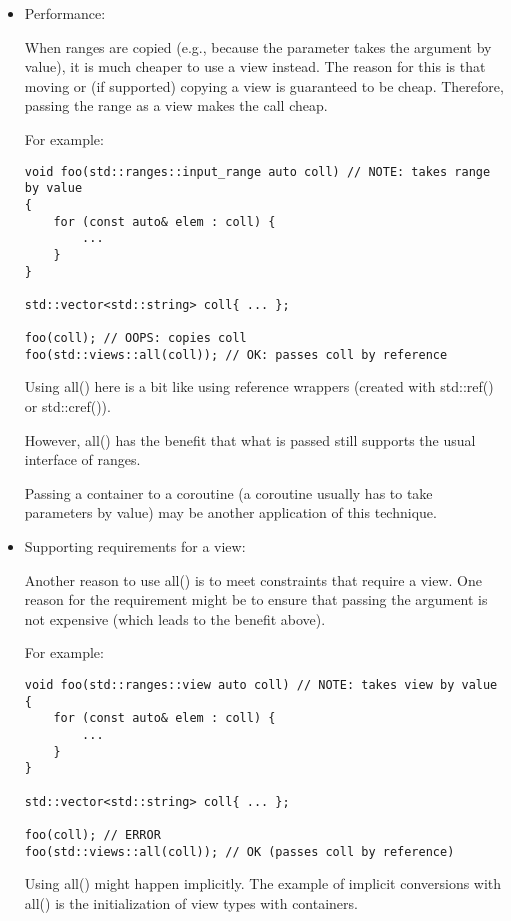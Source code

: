 \begin{itemize}
\item
Performance:

When ranges are copied (e.g., because the parameter takes the argument by value), it is much cheaper to use a view instead. The reason for this is that moving or (if supported) copying a view is guaranteed to be cheap. Therefore, passing the range as a view makes the call cheap.

For example:

\begin{lstlisting}[style=styleCXX]
void foo(std::ranges::input_range auto coll) // NOTE: takes range by value
{
	for (const auto& elem : coll) {
		...
	}
}

std::vector<std::string> coll{ ... };

foo(coll); // OOPS: copies coll
foo(std::views::all(coll)); // OK: passes coll by reference
\end{lstlisting}

Using all() here is a bit like using reference wrappers (created with std::ref() or std::cref()).

However, all() has the benefit that what is passed still supports the usual interface of ranges.

Passing a container to a coroutine (a coroutine usually has to take parameters by value) may be another application of this technique.

\item
Supporting requirements for a view: 

Another reason to use all() is to meet constraints that require a view. One reason for the requirement might be to ensure that passing the argument is not expensive (which leads to the benefit above).

For example:

\begin{lstlisting}[style=styleCXX]
void foo(std::ranges::view auto coll) // NOTE: takes view by value
{
	for (const auto& elem : coll) {
		...
	}
}

std::vector<std::string> coll{ ... };

foo(coll); // ERROR
foo(std::views::all(coll)); // OK (passes coll by reference)
\end{lstlisting}

Using all() might happen implicitly. The example of implicit conversions with all() is the initialization of view types with containers.
\end{itemize}

